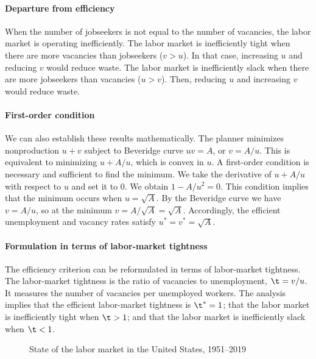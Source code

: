 \documentclass[letterpaper,12pt,leqno]{article}
\newcommand{\pdf}{../../figures/xsquareroot_202206.pdf}
\begin{document}
\paragraph{Departure from efficiency} When the number of jobseekers is not equal to the number of vacancies, the labor market is operating inefficiently. The labor market is inefficiently tight when there are more vacancies than jobseekers ($v > u$). In that case, increasing $u$ and reducing $v$ would reduce waste. The labor market is inefficiently slack when there are more jobseekers than vacancies ($u > v$). Then, reducing $u$ and increasing $v$ would reduce waste.

\paragraph{First-order condition} We can also establish these results mathematically. The planner minimizes nonproduction $u + v$ subject to Beveridge curve $uv = A$, or $v = A/u$. This is equivalent to minimizing $u+A/u$, which is convex in $u$. A first-order condition is necessary and sufficient to find the minimum. We take the derivative of $u+A/u$ with respect to $u$ and set it to $0$. We obtain $1-A/u^2 = 0$. This condition implies that the minimum occurs when $u = \sqrt{A}$. By the Beveridge curve we have $v = A/u$, so at the minimum $v = A/ \sqrt{A} = \sqrt{A}$. Accordingly, the efficient unemployment and vacancy rates satisfy $u^* = v^* = \sqrt{A}$.

\paragraph{Formulation in terms of labor-market tightness} The efficiency criterion can be reformulated in terms of labor-market tightness. The labor-market tightness is the ratio of vacancies to unemployment, $\t = v/u$. It measures the number of vacancies per unemployed workers. The analysis implies that the efficient labor-market tightness is $\t^* = 1$; that the labor market is inefficiently tight when $\t > 1$; and that the labor market is inefficiently slack when $\t < 1$. 

\begin{figure}[t]
\hfill
{}
\caption{State of the labor market in the United States, 1951--2019}
\label{f:state1951}\end{figure}
\end{document}
